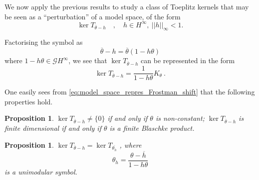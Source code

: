 \documentclass{article}
\numberwithin{equation}{section}
\theoremstyle{plain}
\newtheorem{prop}[thm]{Proposition}
\newcommand{\Hinf}{\ensuremath{H^\infty}}
\newcommand{\GG}{\ensuremath{\mathcal{G}}}
\newcommand{\ol}[1]{\ensuremath{\overline{#1}}}
\newcommand{\zero}{\ensuremath{\{0\}}}
\begin{document}
We now apply the previous results to study a class of Toeplitz kernels that may be seen as a ``perturbation'' of a model space, of the form
\begin{equation}
\label{eq:perturbation_kernel}
\ker T_{\ol\theta - h} \quad , \quad h \in \Hinf, \ ||h||_\infty <1.
\end{equation}


Factorising the symbol as
\begin{equation}
\ol\theta - h = \ol\theta (1 - h\theta)
\end{equation}
where $1-h\theta \in\GG\Hinf$, we see that $\ker T_{\ol\theta - h}$ can be represented in the form
\begin{equation}
\label{eq:model_space_repres_Frostman_shift}
\ker T_{\ol\theta - h} = \frac{1}{1 - h\theta} K_\theta\ .
\end{equation}


One easily sees from \eqref{eq:model_space_repres_Frostman_shift} that the following properties hold.


\begin{prop}
$\ker T_{\ol\theta - h} \neq \zero$ if and only if $\theta$ is non-constant;
$\ker T_{\ol\theta - h}$ is finite dimensional if and only if $\theta$ is a finite Blaschke product.
\end{prop}


\begin{prop}
\label{prop:ker_theta_h}
$\ker T_{\ol\theta - h} = \ker T_{\ol{\theta_h}}$ , where
\begin{equation}
\theta_h = \frac{\theta - \ol h}{1 - h	\theta}
\end{equation}
is a unimodular symbol.
\end{prop}
\end{document}
